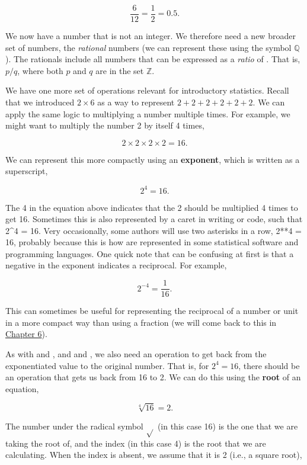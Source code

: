 \documentclass[
  openany]{krantz}
\begin{document}
\[\frac{6}{12} = \frac{1}{2} = 0.5.\]

We now have a number that is not an integer.
We therefore need a new broader set of numbers, the \emph{rational} numbers (we can represent these using the symbol \(\mathbb{Q}\)).
The rationals include all numbers that can be expressed as a \emph{ratio} of .
That is, \(p / q\), where both \(p\) and \(q\) are in the set \(\mathbb{Z}\).

We have one more set of operations relevant for introductory statistics.
Recall that we introduced \(2 \times 6\) as a way to represent \(2 + 2 + 2 + 2 + 2 + 2\).
We can apply the same logic to multiplying a number multiple times.
For example, we might want to multiply the number 2 by itself 4 times,

\[2 \times 2 \times 2 \times 2 = 16.\]

We can represent this more compactly using an \textbf{exponent}, which is written as a superscript,

\[2^{4} = 16.\]

The 4 in the equation above indicates that the 2 should be multiplied 4 times to get 16.
Sometimes this is also represented by a caret in writing or code, such that 2\^{}4 = 16.
Very occasionally, some authors will use two asterisks in a row, 2**4 = 16, probably because this is how  are represented in some statistical software and programming languages.
One quick note that can be confusing at first is that a negative in the exponent indicates a reciprocal.
For example,

\[2^{-4} = \frac{1}{16}.\]

This can sometimes be useful for representing the reciprocal of a number or unit in a more compact way than using a fraction (we will come back to this in \protect\hyperlink{Chapter_6}{Chapter 6}).

As with  and , and  and , we also need an operation to get back from the exponentiated value to the original number.
That is, for \(2^{4} = 16\), there should be an operation that gets us back from 16 to 2.
We can do this using the \textbf{root} of an equation,

\[\sqrt[4]{16} = 2.\]

The number under the radical symbol \(\sqrt{}\) (in this case 16) is the one that we are taking the root of, and the index (in this case 4) is the root that we are calculating.
When the index is absent, we assume that it is 2 (i.e., a square root),
\end{document}
